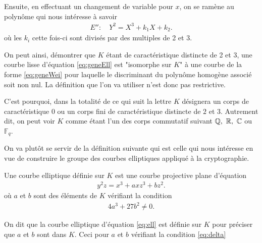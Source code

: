 Ensuite, en effectuant un changement de variable pour $x$, on se ramène au polynôme qui nous
intéresse à savoir 
\begin{align}
    \label{eq:geneWei}
E'' :\quad Y^2 = X^3 + k_1X + k_2
.\end{align}
où les $k_{i}$ cette fois-ci sont divisés par des multiples de 2 et 3.

On peut ainsi, démontrer que $K$ étant de caractéristique distincte de 2 et 3, une courbe
lisse d'équation \eqref{eq:geneEll} est "isomorphe sur $K$" à une courbe de la forme
\eqref{eq:geneWei} pour laquelle le discriminant du polynôme homogène
associé soit non nul.  La définition que l'on va utiliser n'est donc pas restrictive.


C'est pourquoi, dans la totalité de ce qui suit la lettre $K$ désignera un corps de caractéristique $0$ ou un
corps fini de caractéristique distincte de $2$ et $3$. Autrement dit, on peut voir $K$
comme étant l'un des corps commutatif suivant $\mathbb{Q},\ \mathbb{R},\ \mathbb{C}$ ou $\mathbb{F}_{q}$.


On va plutôt se servir de la définition suivante qui est celle qui nous intéresse en
vue de construire le groupe des courbes elliptiques appliqué à la cryptographie.

\begin{definition}
    \label{def:ell}
    Une courbe elliptique définie sur $K$ est une courbe projective plane d'équation
    \begin{align}
        \label{eq:ell}
    y^2z=x^3+axz^3+bz^2
    .\end{align}
    où $a$ et $b$ sont des éléments de $K$ vérifiant la condition
    \begin{align}
        \label{eq:delta}
    4a^3+27b^2\neq 0
    .\end{align}
\end{definition}

\begin{remarque}
On dit que la courbe elliptique d'équation \ref{eq:ell} est définie sur $K$ pour préciser
que $a$ et $b$ sont dans $K$. Ceci pour $a$ et $b$ vérifiant la condition \eqref{eq:delta} 
\end{remarque}


